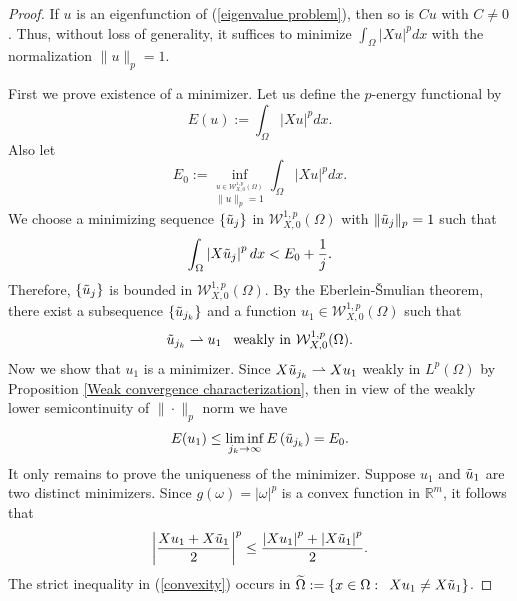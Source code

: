 \documentclass[a4paper,12pt,reqno]{amsart}
\renewcommand\eqref[1]{(\ref{#1})} %
\numberwithin{equation}{section}
\theoremstyle{plain}
\theoremstyle{definition}
\begin{document}
\begin{proof}
If $u$ is an eigenfunction of \eqref{eigenvalue problem}, then so is $Cu$ with $C\neq 0$.
Thus, without loss of generality, it suffices to minimize $\int_{\Omega}|X u|^p d x$ with  the normalization $\|u\|_{p}=1$.

First we prove existence of a minimizer. Let us define the $p$-energy functional by
\begin{equation}\label{p-energy functional}
E(u):=\int_{\Omega}|X u|^{p} d x.
\end{equation}
Also let
\begin{equation*}
E_{0}:=\inf_{\stackrel{u \in \mathcal{W}_{X,0}^{1, p}(\Omega)}{\|u\|_{p}=1}} \int_{\Omega}|X u|^{p} d x.
\end{equation*}
We choose a minimizing sequence  $\left\{\Tilde{u}_{j}\right\}$ in $ \mathcal{W}_{X,0}^{1, p}(\Omega)$ with $\|\Tilde{u}_{j}\|_{p}=1$ such that
\begin{equation*}
\int_{\Omega}\left|X\Tilde{u}_{j}\right|^{p} d x<E_{0}+\frac{1}{j}.
\end{equation*}
Therefore, $\left\{\Tilde{u}_{j}\right\}$ is bounded in
$\mathcal{W}_{X,0}^{1, p}(\Omega)$.  By the Eberlein-\v{S}mulian theorem,  there exist  a subsequence $\{\Tilde{u}_{j_{k}}\}$ and a function $u_{1} \in \mathcal{W}_{X,0}^{1, p}(\Omega)$ such that
\begin{equation*}
\Tilde{u}_{j_{k}} \rightharpoonup  u_{1}\enspace \text{ weakly in } \mathcal{W}_{X,0}^{1, p}(\Omega). 
\end{equation*}
Now we show that $u_{1}$ is a minimizer. Since $X\Tilde{u}_{j_{k}} \rightharpoonup  Xu_{1}$ weakly in $L^{p}(\Omega)$ by Proposition \ref{Weak convergence characterization}, then in view of the weakly lower semicontinuity of $\|\cdot\|_{p}$ norm we have
\begin{equation*}
E(u_{1}) \leq \liminf _{j_{k} \rightarrow \infty} E\left(\Tilde{u}_{j_{k}}\right)=E_{0}. 
\end{equation*}
It only remains to prove the uniqueness of the minimizer. Suppose $u_{1}$ and $\Tilde{u}_{1}$ are two distinct minimizers. Since $g(\omega)=|\omega|^{p}$ is a convex function in $\mathbb{R}^{m}$, it follows that
\begin{equation}\label{convexity}
\left|\frac{Xu_{1}+X\Tilde{u}_{1}}{2}\right|^{p} \leq \frac{\left|Xu_{1}\right|^{p}+\left|X\Tilde{u}_{1}\right|^{p}}{2}.
\end{equation}
The strict inequality in \eqref{convexity} occurs in $\widetilde{\Omega}:=\left\{x\in\Omega:\enspace Xu_{1} \neq X\Tilde{u}_{1}\right\}$.

\end{proof}
\end{document}

